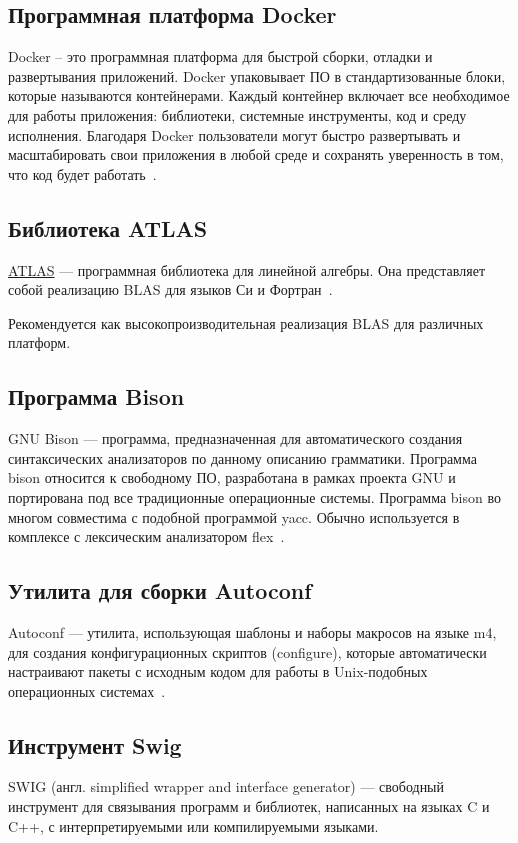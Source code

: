 \subsection{Программная платформа Docker}
Docker – это программная платформа для быстрой сборки, отладки и развертывания
приложений. Docker упаковывает ПО в стандартизованные блоки, которые называются
контейнерами. Каждый контейнер включает все необходимое для работы приложения:
библиотеки, системные инструменты, код и среду исполнения. Благодаря Docker
пользователи могут быстро развертывать и масштабировать свои приложения в любой
среде и сохранять уверенность в том, что код будет работать~\cite{docker}.

\subsection{Библиотека ATLAS}
\hyperlink{atlas}{ATLAS} — программная библиотека для линейной алгебры. Она
представляет собой реализацию BLAS для языков Си и Фортран~\cite{atlas}.

Рекомендуется как высокопроизводительная реализация BLAS для различных платформ.

\subsection{Программа Bison}
GNU Bison — программа, предназначенная для автоматического создания
синтаксических анализаторов по данному описанию грамматики. Программа bison
относится к свободному ПО, разработана в рамках проекта GNU и портирована под
все традиционные операционные системы. Программа bison во многом совместима с
подобной программой yacc. Обычно используется в комплексе с лексическим
анализатором flex~\cite{bison}.

\subsection{Утилита для сборки Autoconf}
Autoconf — утилита, использующая шаблоны и наборы макросов на языке m4, для
создания конфигурационных скриптов (configure), которые автоматически настраивают
пакеты с исходным кодом для работы в Unix-подобных операционных системах~\cite{autoconf}.

\subsection{Инструмент Swig}
SWIG (англ. simplified wrapper and interface generator) — свободный инструмент
для связывания программ и библиотек, написанных на языках C и C++, с
интерпретируемыми или компилируемыми языками.

